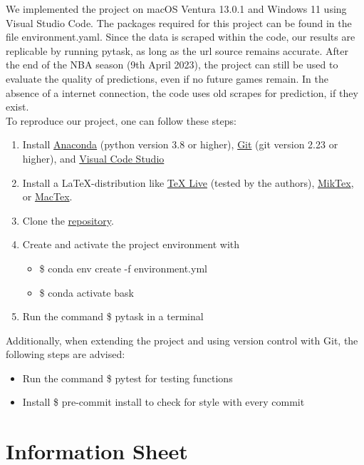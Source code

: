 \documentclass[11pt, a4paper, leqno]{article}
\begin{document}
We implemented the project on macOS Ventura 13.0.1 and Windows 11 using Visual Studio Code. The packages required for this project can be found in the file environment.yaml.
Since the data is scraped within the code, our results are replicable by running pytask, as long as the url source remains accurate.
After the end of the NBA season (9th April 2023), the project can still be used to evaluate the quality of predictions, even if no future games remain.
In the absence of a internet connection, the code uses old scrapes for prediction, if they exist.
\\
To reproduce our project, one can follow these steps:
\begin{enumerate}
    \item Install \href{https://docs.anaconda.com/anaconda/install/index.html}{Anaconda} (python version 3.8 or higher), \href{https://git-scm.com/}{Git} (git version 2.23 or higher), and \href{https://code.visualstudio.com/download}{Visual Code Studio}
    \item Install a \LaTeX-distribution like  \href{https://www.tug.org/texlive/}{TeX Live} (tested by the authors), \href{https://miktex.org/}{MikTex}, or \href{https://tug.org/mactex/}{MacTex}.
    \item Clone the \href{https://github.com/NormProgr/basketball_predict}{repository}.
    \item Create and activate the project environment with
        \begin{itemize}
            \item \$ conda env create -f environment.yml
            \item \$ conda activate bask
        \end{itemize}
    \item Run the command \$ pytask in a terminal
\end{enumerate}

Additionally, when extending the project and using version control with Git, the following steps are advised:
\begin{itemize}
    \item Run the command \$ pytest for testing functions
    \item Install \$ pre-commit install to check for style with every commit
\end{itemize}

\clearpage
\section{Information Sheet}
\end{document}
